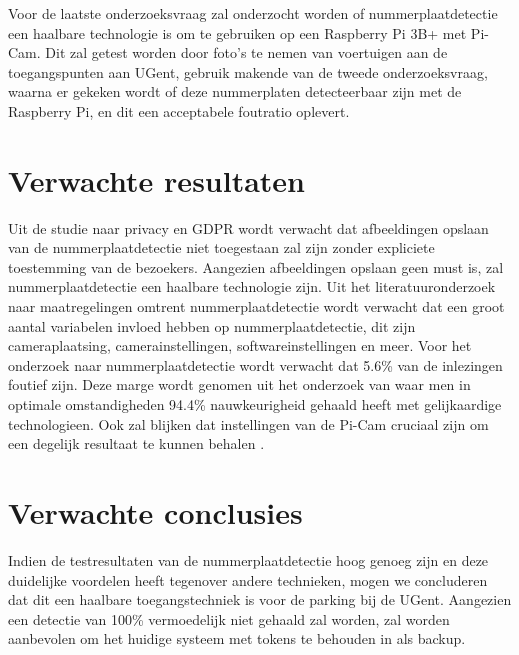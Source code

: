 Voor de laatste onderzoeksvraag zal onderzocht worden of nummerplaatdetectie een haalbare technologie is om te gebruiken op een Raspberry Pi 3B+ met Pi-Cam. Dit zal getest worden door foto’s te nemen van voertuigen aan de toegangspunten aan UGent, gebruik makende van de tweede onderzoeksvraag, waarna er gekeken wordt of deze nummerplaten detecteerbaar zijn met de Raspberry Pi, en dit een acceptabele foutratio oplevert.

\section{Verwachte resultaten}
\label{sec:verwachte_resultaten}

Uit de studie naar privacy en GDPR wordt verwacht dat afbeeldingen opslaan van de nummerplaatdetectie niet toegestaan zal zijn zonder expliciete toestemming van de bezoekers. Aangezien afbeeldingen opslaan geen must is, zal nummerplaatdetectie een haalbare technologie zijn.
Uit het literatuuronderzoek naar maatregelingen omtrent nummerplaatdetectie wordt verwacht dat een groot aantal variabelen invloed hebben op nummerplaatdetectie, dit zijn cameraplaatsing, camerainstellingen, softwareinstellingen en meer.
Voor het onderzoek naar nummerplaatdetectie wordt verwacht dat 5.6\% van de inlezingen foutief zijn. Deze marge wordt genomen uit het onderzoek van \textcite{figuerola2016automated} waar men in optimale omstandigheden 94.4\% nauwkeurigheid gehaald heeft met gelijkaardige technologieen.
Ook zal blijken dat instellingen van de Pi-Cam cruciaal zijn om een degelijk resultaat te kunnen behalen \autocite{gurney2013effect}.

\section{Verwachte conclusies}
\label{sec:verwachte_conclusies}

Indien de testresultaten van de nummerplaatdetectie hoog genoeg zijn en deze duidelijke voordelen heeft tegenover andere technieken, mogen we concluderen dat dit een haalbare toegangstechniek is voor de parking bij de UGent. Aangezien een detectie van 100\% vermoedelijk niet gehaald zal worden, zal worden aanbevolen om het huidige systeem met tokens te behouden in als backup.
